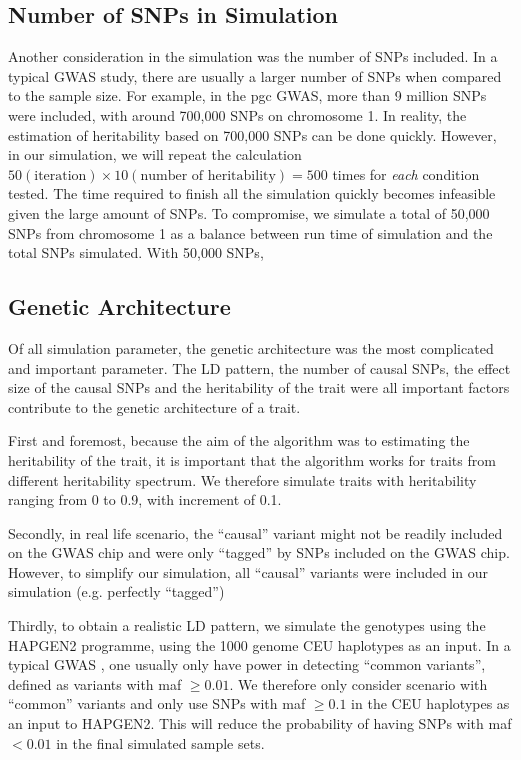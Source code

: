 		\subsection{Number of SNPs in Simulation}
			Another consideration in the simulation was the number of \glspl{SNP} included.
			In a typical \gls{GWAS} study, there are usually a larger number of \glspl{SNP} when compared to the sample size. 
			For example, in the \gls{pgc}  \gls{GWAS}, more than 9 million \glspl{SNP} were included, with around 700,000 \glspl{SNP} on chromosome 1.
			In reality, the estimation of heritability based on 700,000 \glspl{SNP} can be done quickly.
			However, in our simulation, we will repeat the calculation $50(\text{iteration})\times10(\text{number of heritability})=500$ times for \emph{each} condition tested. 
			The time required to finish all the simulation quickly becomes infeasible given the large amount of \glspl{SNP}.
			To compromise, we simulate a total of 50,000 \glspl{SNP} from chromosome 1 as a balance between run time of simulation and the total \glspl{SNP} simulated.
			With 50,000 \glspl{SNP}, 
		\subsection{Genetic Architecture}
			Of all simulation parameter, the genetic architecture was the most complicated and important parameter. 
			The \gls{LD} pattern, the number of causal \glspl{SNP}, the effect size of the causal \glspl{SNP} and the heritability of the trait were all important factors contribute to the genetic architecture of a trait. 
		
			First and foremost, because the aim of the algorithm was to estimating the heritability of the trait, it is important that the algorithm works for traits from different heritability spectrum.
			We therefore simulate traits with heritability ranging from 0 to 0.9, with increment of 0.1.
		
			Secondly, in real life scenario, the ``causal'' variant might not be readily included on the \gls{GWAS} chip and were only ``tagged'' by \glspl{SNP} included on the \gls{GWAS} chip.
			However, to simplify our simulation, all ``causal'' variants were included in our simulation (e.g. perfectly ``tagged'')
		
			Thirdly, to obtain a realistic \gls{LD} pattern, we simulate the genotypes using the HAPGEN2 programme\citep{Su2011}, using the 1000 genome \gls{CEU} haplotypes as an input.
			In a typical \gls{GWAS} , one usually only have power in detecting ``common variants'', defined as variants with \gls{maf} $\ge 0.01$.
			We therefore only consider scenario with ``common'' variants and only use \glspl{SNP} with \gls{maf} $\ge0.1$ in the \gls{CEU} haplotypes as an input to HAPGEN2. 
			This will reduce the probability of having \glspl{SNP} with \gls{maf} $<0.01$ in the final simulated sample sets.
			
